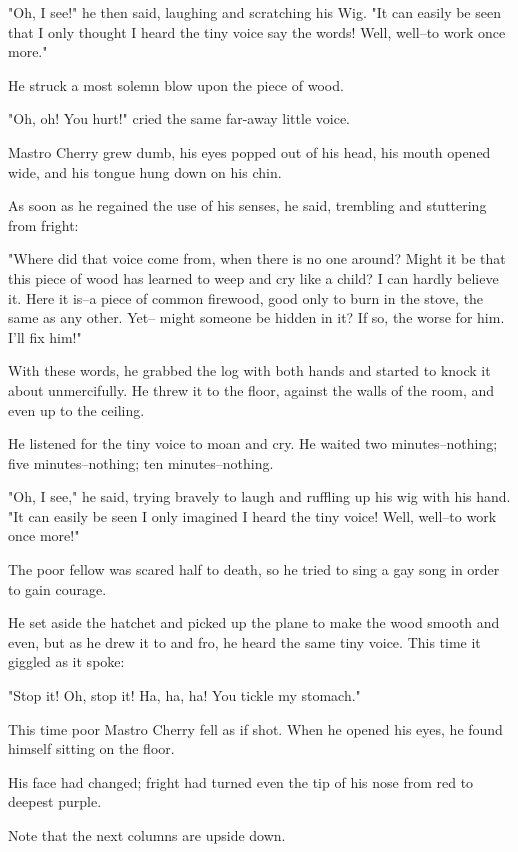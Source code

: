 \documentclass[12pt,twoside,twocolumn]{article}
\begin{document}
{  "Oh, I see!" he then said, laughing and scratching his Wig.
  "It can easily be seen that I only thought I heard the tiny
  voice say the words! Well, well--to work once more."

  He struck a most solemn blow upon the piece of wood.

  "Oh, oh!  You hurt!" cried the same far-away little voice.

  Mastro Cherry grew dumb, his eyes popped out of his
  head, his mouth opened wide, and his tongue hung down
  on his chin.

  As soon as he regained the use of his senses, he said,
  trembling and stuttering from fright:

  "Where did that voice come from, when there is no
  one around?  Might it be that this piece of wood has
  learned to weep and cry like a child?  I can hardly
  believe it.  Here it is--a piece of common firewood, good
  only to burn in the stove, the same as any other.  Yet--
  might someone be hidden in it?  If so, the worse for him.
  I'll fix him!"

  With these words, he grabbed the log with both hands
  and started to knock it about unmercifully.  He threw it
  to the floor, against the walls of the room, and even up
  to the ceiling.

  He listened for the tiny voice to moan and cry.
  He waited two minutes--nothing; five minutes--nothing;
  ten minutes--nothing.

  "Oh, I see," he said, trying bravely to laugh and
  ruffling up his wig with his hand.  "It can easily be seen
  I only imagined I heard the tiny voice!  Well, well--to
  work once more!"

  The poor fellow was scared half to death, so he tried
  to sing a gay song in order to gain courage.

  He set aside the hatchet and picked up the plane to
  make the wood smooth and even, but as he drew it to
  and fro, he heard the same tiny voice.  This time it giggled
  as it spoke:

  "Stop it!  Oh, stop it!  Ha, ha, ha! You tickle my stomach."

  This time poor Mastro Cherry fell as if shot.  When
  he opened his eyes, he found himself sitting on the floor.

  His face had changed; fright had turned even the tip of
  his nose from red to deepest purple.

}
\bigskip
Note that the next columns are upside down.
\end{document}
